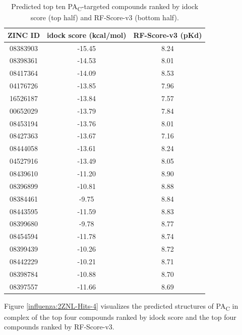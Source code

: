 \begin{table}
\caption{Predicted top ten PA\textsubscript{C}-targeted compounds ranked by idock score (top half) and RF-Score-v3 (bottom half).}
\label{influenza:2ZNL-Hits-10}
\begin{tabular}{ccc}
\hline
ZINC ID & idock score (kcal/mol) & RF-Score-v3 (pKd)\\
\hline
08383903 & -15.45 & 8.24\\
08398361 & -14.53 & 8.01\\
08417364 & -14.09 & 8.53\\
04176726 & -13.85 & 7.96\\
16526187 & -13.84 & 7.57\\
00652029 & -13.79 & 7.84\\
08453194 & -13.76 & 8.01\\
08427363 & -13.67 & 7.16\\
08444058 & -13.61 & 8.24\\
04527916 & -13.49 & 8.05\\
\hline
08439610 & -11.20 & 8.90\\
08396899 & -10.81 & 8.88\\
08384461 &  -9.75 & 8.84\\
08443595 & -11.59 & 8.83\\
08399680 &  -9.78 & 8.77\\
08454594 & -11.78 & 8.74\\
08399439 & -10.26 & 8.72\\
08442229 & -10.21 & 8.71\\
08398784 & -10.88 & 8.70\\
08397557 & -11.66 & 8.69\\
\hline
\end{tabular}
\end{table}

Figure \ref{influenza:2ZNL-Hits-4} visualizes the predicted structures of PA\textsubscript{C} in complex of the top four compounds ranked by idock score and the top four compounds ranked by RF-Score-v3.

